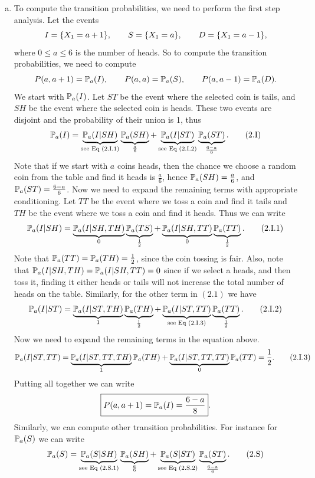 \begin{solution}
	\begin{enumerate}[(a)]
		\item To compute the transition probabilities, we need to perform the first step analysis. Let the events \[I = \{X_1 = a+1\},\qquad S = \{X_1 = a\},\qquad D = \{X_1 = a-1\},\]
		where $0 \leq a \leq 6$ is the number of heads. So to compute the transition probabilities, we need to compute
		\[ P(a,a+1) = \mathbb{P}_a(I), \qquad P(a,a) = \mathbb{P}_a(S), \qquad P(a,a-1) = \mathbb{P}_a(D). \]
		We start with $\mathbb{P}_a(I)$. Let $ST$ be the event where the selected coin is tails, and $SH$ be the event where the selected coin is heads. These two events are disjoint and the probability of their union is 1, thus
		\[ \mathbb{P}_a(I) = \underbrace{\mathbb{P}_a(I|SH)}_{\text{see Eq (2.I.1)}}\underbrace{\mathbb{P}_a(SH)}_{\frac{a}{6}} + \underbrace{\mathbb{P}_a(I|ST)}_{\text{see Eq (2.I.2)}}\underbrace{\mathbb{P}_a(ST)}_{\frac{6-a}{6}}. \tag{2.I}\]
		Note that if we start with $a$ coins heads, then the chance we choose a random coin from the table and find it heads is $\frac{a}{6}$, hence $\mathbb{P}_a(SH) = \frac{a}{6}$, and $\mathbb{P}_a(ST) = \frac{6-a}{6}$. Now we need to expand the remaining terms with appropriate conditioning. Let $TT$ be the event where we toss a coin and find it tails and $TH$ be the event where we toss a coin and find it heads. Thus we can write
		\[ \mathbb{P}_a(I|SH) = \underbrace{\mathbb{P}_a(I|SH,TH)}_{0}\underbrace{\mathbb{P}_a(TS)}_\frac{1}{2} + \underbrace{\mathbb{P}_a(I|SH,TT)}_{0}\underbrace{\mathbb{P}_a(TT)}_\frac{1}{2}. \tag{2.I.1}  \]
		Note that $\mathbb{P}_a(TT) = \mathbb{P}_a(TH) = \frac{1}{2}$, since the coin tossing is fair. Also, note that $\mathbb{P}_a(I|SH,TH)=\mathbb{P}_a(I|SH,TT)=0$ since if we select a heads, and then toss it, finding it either heads or tails will not increase the total number of heads on the table. Similarly, for the other term in $(2.1)$ we have
		\[ \mathbb{P}_a(I|ST) = \underbrace{\mathbb{P}_a(I|ST,TH)}_{1}\underbrace{\mathbb{P}_a(TH)}_{\frac{1}{2}} + \underbrace{\mathbb{P}_a(I|ST,TT)}_\text{see Eq (2.I.3)}\underbrace{\mathbb{P}_a(TT)}_{\frac{1}{2}}. \tag{2.I.2} \]
		Now we need to expand the remaining terms in the equation above.
		\[ \mathbb{P}_a(I|ST,TT) = \underbrace{\mathbb{P}_a(I|ST,TT,TH)}_{1}\mathbb{P}_a(TH) + \underbrace{\mathbb{P}_a(I|ST,TT,TT)}_{0}\mathbb{P}_a(TT) = \frac{1}{2}. \tag{2.I.3}  \]
		Putting all together we can write
		\[ \boxed{P(a,a+1) = \mathbb{P}_a(I) = \frac{6-a}{8}}. \]
		Similarly, we can compute other transition probabilities. For instance for $\mathbb{P}_a(S)$ we can write
		\[ \mathbb{P}_a(S) = \underbrace{\mathbb{P}_a(S|SH)}_{\text{see Eq (2.S.1)}}\underbrace{\mathbb{P}_a(SH)}_{\frac{a}{6}} + \underbrace{\mathbb{P}_a(S|ST)}_{\text{see Eq (2.S.2)}}\underbrace{\mathbb{P}_a(ST)}_{\frac{6-a}{6}}. \tag{2.S}\]

\end{enumerate}
\end{solution}
